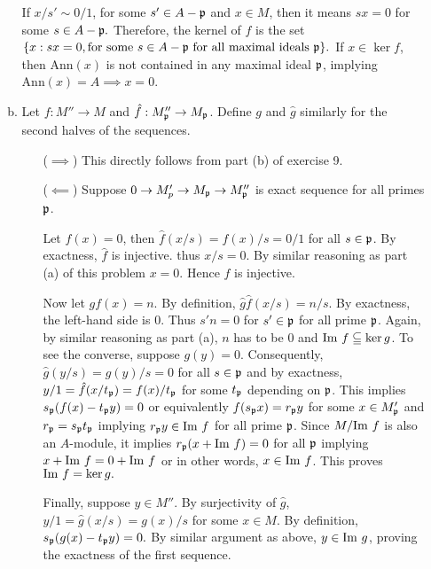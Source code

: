 \documentclass{article}
\theoremstyle{definition}
\theoremstyle{remark}
\begin{document}
\begin{enumerate}[(1)]
\begin{enumerate}[(a)]
                \newcommand{\Ann}{\mathrm{Ann}}
                If $x/s' \sim 0/1$, for some $s' \in A -\mathfrak{p}$ and $x \in M$,  then it means $sx = 0$ for some $s \in A - \mathfrak{p}.$ Therefore, the kernel of $f$ is the set $\{x : sx = 0, \text{for some }s \in A - \mathfrak{p} \text{ for all maximal ideals } \mathfrak{p}\}.$ If $x \in \ker f$, then $\Ann(x)$ is not contained in any maximal ideal $\mathfrak{p}$, implying $\Ann(x) = A \implies x = 0$.



                \newcommand{\p}{\I p}
                \newcommand{\h}[1]{\hat{#1}}
          \item Let $f: M'' \to M$ and $\h f: M''_\p \to M_\p$. Define $g$ and $\h g$ similarly for the second halves of the sequences.

                \begin{itemize}
                  \item[($\implies$)] This directly follows from part (b) of exercise 9.
                  \item[($\impliedby$)] Suppose $0 \to M'_p \to M_\p \to M''_\p$ is exact sequence for all primes $\p$.

                        Let $f(x) = 0$, then  $\h f(x/s) = f(x)/s = 0/1$ for all $s \in \p$. By exactness, $\h f$ is injective. thus $x/s = 0$. By similar reasoning as part (a) of this problem $x = 0$. Hence $f$ is injective.

                        Now let $gf(x) = n$. By definition, $\h g \h f(x/s) = n/s$. By exactness, the left-hand side is $0$. Thus $s'n = 0$ for $s' \in \p$ for all prime $\p$. Again, by similar reasoning as part (a), $n$ has to be $0$ and $\mathrm{Im}\  f \subseteqq \ker g$. To see the converse, suppose $g(y) = 0$. Consequently, $\h g(y/s) =  g(y)/s = 0$ for all $s \in \p$ and  by exactness,  $y/1 = \h f(x/t_\p) = f(x)/t_\p$ for some $t_\p$ depending on $\p$. This implies $s_\p(f(x) - t_\p y) = 0$ or equivalently $f(s_\p x) = r_\p y$ for some $x \in M'_\p$ and $r_\p = s_\p t_\p$ implying $r_\p y \in \Img f$ for all prime $\p$. Since $M/\mathrm{Im}\  f$ is also an $A$-module, it implies $r_\p(x + \Img f) = 0$ for all $\p$ implying $x + \mathrm{Im}\  f = 0 + \mathrm{Im}\  f$ or in other words, $x \in \mathrm{Im}\  f$. This proves $\mathrm{Im}\  f  = \ker g.$

                        Finally, suppose $y \in M''$. By surjectivity of $\h g$, $y/1 = \h g(x/s) = g(x)/s$ for some $x \in M$. By definition, $s_\p(g(x) - t_\p y) = 0.$ By similar argument as above, $y \in \mathrm{Im}\  g$, proving the exactness of the first sequence.


\end{itemize}
\end{enumerate}
\end{enumerate}
\end{document}
